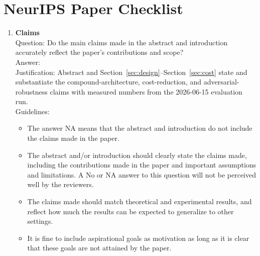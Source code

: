 \documentclass{article}
\begin{document}
\section*{NeurIPS Paper Checklist}
\label{app:checklist}

\begin{enumerate}

\item {\bf Claims}\\
Question: Do the main claims made in the abstract and introduction accurately reflect the paper's contributions and scope?\\
Answer: \answerYes{}\\
Justification: Abstract and Section~\ref{sec:design}--Section~\ref{sec:cost} state and substantiate the compound-architecture, cost-reduction, and adversarial-robustness claims with measured numbers from the 2026-06-15 evaluation run.\\
Guidelines:
\begin{itemize}
\item The answer NA means that the abstract and introduction do not include the claims made in the paper.
\item The abstract and/or introduction should clearly state the claims made, including the contributions made in the paper and important assumptions and limitations. A No or NA answer to this question will not be perceived well by the reviewers.
\item The claims made should match theoretical and experimental results, and reflect how much the results can be expected to generalize to other settings.
\item It is fine to include aspirational goals as motivation as long as it is clear that these goals are not attained by the paper.
\end{itemize}


\end{enumerate}
\end{document}
